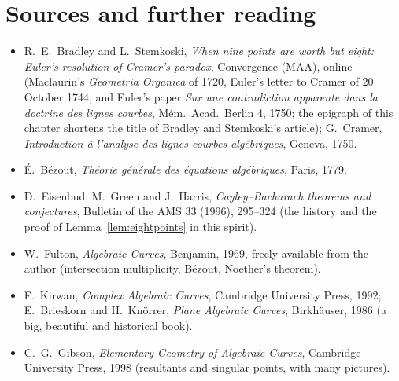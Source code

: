 \section*{Sources and further reading}

\begin{itemize}
\item R.~E.~Bradley and L.~Stemkoski, \emph{When nine points are worth but eight: Euler's resolution of Cramer's paradox}, Convergence (MAA), online (Maclaurin's
\emph{Geometria Organica} of 1720, Euler's letter to Cramer of 20 October 1744, and Euler's paper \emph{Sur une contradiction apparente dans la doctrine des
lignes courbes}, M\'em.\ Acad.\ Berlin 4, 1750; the epigraph of this chapter shortens the title of Bradley and Stemkoski's article); G.~Cramer, \emph{Introduction \`a l'analyse des lignes courbes
alg\'ebriques}, Geneva, 1750.
\item \'E.~B\'ezout, \emph{Th\'eorie g\'en\'erale des \'equations alg\'ebriques}, Paris, 1779.
\item D.~Eisenbud, M.~Green and J.~Harris, \emph{Cayley--Bacharach theorems and conjectures}, Bulletin of the AMS 33 (1996), 295--324 (the history and the proof
of Lemma~\ref{lem:eightpoints} in this spirit).
\item W.~Fulton, \emph{Algebraic Curves}, Benjamin, 1969, freely available from the author (intersection multiplicity, B\'ezout, Noether's theorem).
\item F.~Kirwan, \emph{Complex Algebraic Curves}, Cambridge University Press, 1992; E.~Brieskorn and H.~Kn\"orrer, \emph{Plane Algebraic Curves}, Birkh\"auser,
1986 (a big, beautiful and historical book).
\item C.~G.~Gibson, \emph{Elementary Geometry of Algebraic Curves}, Cambridge University Press, 1998 (resultants and singular points, with many pictures).
\end{itemize}
